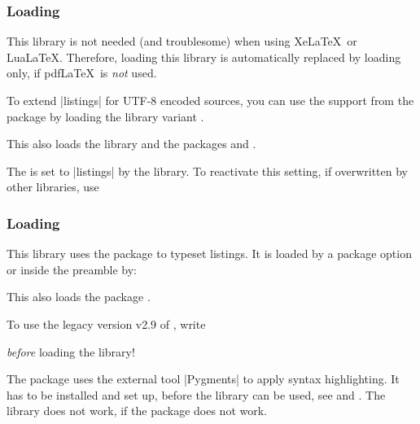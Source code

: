 \subsubsection{Loading }
\begin{marker}
This library is not needed (and troublesome) when using Xe\LaTeX\ or Lua\LaTeX.
Therefore, loading this library is automatically replaced by loading
 only, if pdf\LaTeX\ is \emph{not} used.
\end{marker}
To extend |listings| for UTF-8 encoded sources, you can use the support from
the package  \cite{oberdiek:listingsutf8} by loading the library
variant .
\begin{dispListing}
\end{dispListing}
This also loads the library 
and the packages  \cite{hoffmann:listings}
and  \cite{oberdiek:listingsutf8}.

The  is set to |listings| by the library.
To reactivate this setting, if overwritten by other libraries, use
\begin{dispListing}
\end{dispListing}


\clearpage
\subsubsection{Loading }
This library uses the package  \cite{poore:minted} to typeset
listings. It is loaded by a package option or inside the preamble by:
\begin{dispListing}
\end{dispListing}
This also loads the package  \cite{poore:minted}.

\begin{marker}
To use the legacy version v2.9 of , write
\begin{dispListing}
\usepackage{minted2}
\end{dispListing}
\emph{before} loading the library!
\end{marker}

\begin{marker}
The  package uses the external tool |Pygments| \cite{pygments:web}
to apply syntax highlighting. It has to be installed and set up, before the
library can be used, see \cite{poore:minted} and \cite{pygments:web}.
The  library  does not work, if the package
 \cite{poore:minted} does not work.
\end{marker}

